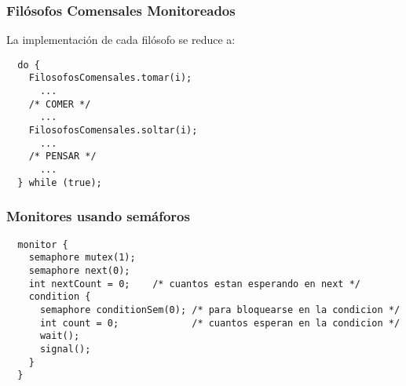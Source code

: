 \documentclass[letter]{beamer}
\begin{document}
\begin{frame}[fragile]
  \frametitle{Filósofos Comensales Monitoreados}

  La implementación de cada filósofo se reduce a:
  
\begin{verbatim}
  do {
    FilosofosComensales.tomar(i);
      ...
    /* COMER */
      ... 
    FilosofosComensales.soltar(i);
      ...
    /* PENSAR */
      ...
  } while (true);
\end{verbatim}

  

\end{frame}
\begin{frame}[fragile]
  \frametitle{Monitores usando semáforos}


\begin{verbatim}
  monitor {
    semaphore mutex(1);
    semaphore next(0);
    int nextCount = 0;    /* cuantos estan esperando en next */
    condition {
      semaphore conditionSem(0); /* para bloquearse en la condicion */
      int count = 0;             /* cuantos esperan en la condicion */
      wait();
      signal();
    }
  }
 \end{verbatim}

\end{frame}
\end{document}
